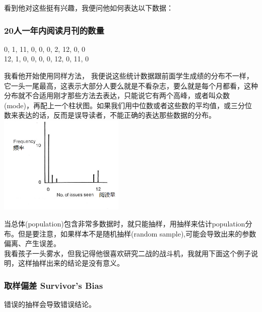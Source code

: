 看到他对这些挺有兴趣，我便问他如何表达以下数据：\\

\hypertarget{ux4ebaux4e00ux5e74ux5185ux9605ux8bfbux6708ux520aux7684ux6570ux91cf}{%
\subsubsection{20人一年内阅读月刊的数量}\label{ux4ebaux4e00ux5e74ux5185ux9605ux8bfbux6708ux520aux7684ux6570ux91cf}}

0, 1, 11, 0, 0, 0, 2, 12, 0, 0\\
12, 1, 0, 0, 0, 0, 12, 0, 11, 0

我看他开始使用同样方法，
我便说这些统计数据跟前面学生成绩的分布不一样，它一头一尾最高，这表示大部分人要么就是不看杂志，要么就是每个月都看，这种分布就不合适用刚才那些方法去表达，只能说它有两个高峰，或者叫众数(mode)，再配上一个柱状图。如果我们用中位数或者这些数的平均值，或三分位数来表达的话，反而是误导读者，不能正确的表达那些数据的分布。\\

\includegraphics[width=6cm]{MA_FA4_10.png}

当总体(population)包含非常多数据时，就只能抽样，用抽样来估计population分布。但是要注意，如果样本不是随机抽样(random
sample),可能会导致出来的参数偏离、产生误差。\\
我看孩子一头雾水，但我记得他很喜欢研究二战的战斗机，我就用下面这个例子说明，这样抽样出来的结论是没有意义。\\

\hypertarget{ux53d6ux6837ux504fux5dee-survivors-bias}{%
\subsubsection{取样偏差 Survivor's
Bias}\label{ux53d6ux6837ux504fux5dee-survivors-bias}}

错误的抽样会导致错误结论。

